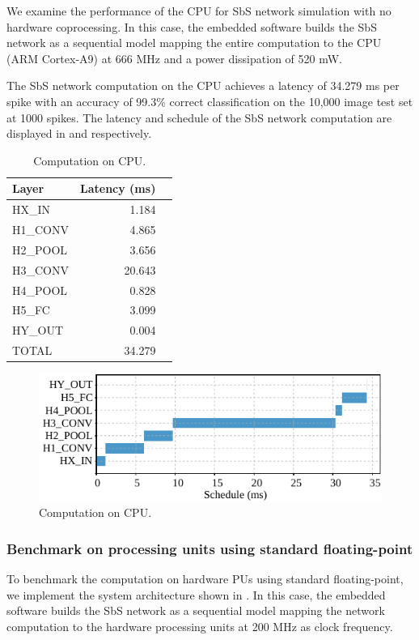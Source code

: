 We examine the performance of the CPU for SbS network simulation with no hardware coprocessing. In this case, the embedded software builds the SbS network as a sequential model mapping the entire computation to the CPU (ARM Cortex-A9) at 666 MHz and a power dissipation of 520 mW.

The SbS network computation on the CPU achieves a latency of 34.279 ms per spike with an accuracy of 99.3\% correct classification on the 10,000 image test set at 1000 spikes. The latency and schedule of the SbS network computation are displayed in  and  respectively.

\begin{table}[!t]\centering
	\caption{Computation on CPU.}\label{tab:latency_sw}
	\scriptsize
\begin{tabular}{lrr}\toprule
	\textbf{Layer} &\textbf{Latency (ms)} \\\midrule
	HX\_IN &1.184 \\
	H1\_CONV &4.865 \\
	H2\_POOL &3.656 \\
	H3\_CONV &20.643 \\
	H4\_POOL &0.828 \\
	H5\_FC &3.099 \\
	HY\_OUT &0.004 \\
		
	TOTAL &34.279 \\
	\bottomrule
\end{tabular}
\end{table}

\begin{figure}[t!]
	\centering
	\includegraphics[width=1\columnwidth]{../figures/latency_sw.pdf}
	\caption{Computation on CPU.}
	\label{fig:latency_sw}
\end{figure}

\subsubsection{Benchmark on processing units using standard floating-point}
To benchmark the computation on hardware PUs using standard floating-point, we implement the system architecture shown in . In this case, the embedded software builds the SbS network as a sequential model mapping the network computation to the hardware processing units at 200 MHz as clock frequency.

